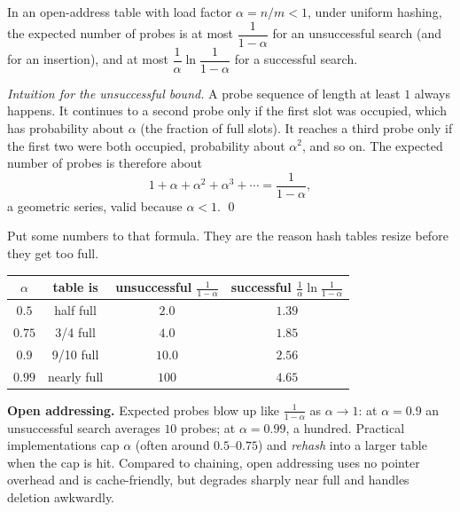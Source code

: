 \begin{theorem}
\label{ch11:open-addr-theorem}
In an open-address table with load factor $\alpha = n/m < 1$, under uniform hashing, the expected number of probes is at most $\dfrac{1}{1-\alpha}$ for an unsuccessful search (and for an insertion), and at most $\dfrac{1}{\alpha}\ln\dfrac{1}{1-\alpha}$ for a successful search.
\end{theorem}

\begin{proof}[Intuition for the unsuccessful bound]
A probe sequence of length at least $1$ always happens. It continues to a second probe only if the first slot was occupied, which has probability about $\alpha$ (the fraction of full slots). It reaches a third probe only if the first two were both occupied, probability about $\alpha^2$, and so on. The expected number of probes is therefore about
\[
  1 + \alpha + \alpha^2 + \alpha^3 + \cdots = \frac{1}{1-\alpha},
\]
a geometric series, valid because $\alpha < 1$. \qed
\end{proof}

Put some numbers to that formula. They are the reason hash tables resize before they get too full.

\begin{center}
\begin{tabular}{cccc}
\toprule
$\alpha$ & table is & unsuccessful $\frac{1}{1-\alpha}$ & successful $\frac{1}{\alpha}\ln\frac{1}{1-\alpha}$ \\
\midrule
$0.5$  & half full     & $2.0$  & $1.39$ \\
$0.75$ & 3/4 full      & $4.0$  & $1.85$ \\
$0.9$  & 9/10 full     & $10.0$ & $2.56$ \\
$0.99$ & nearly full   & $100$  & $4.65$ \\
\bottomrule
\end{tabular}
\end{center}

\begin{complexitybox}
\textbf{Open addressing.} Expected probes blow up like $\frac{1}{1-\alpha}$ as $\alpha \to 1$: at $\alpha = 0.9$ an unsuccessful search averages $10$ probes; at $\alpha = 0.99$, a hundred. Practical implementations cap $\alpha$ (often around $0.5$--$0.75$) and \emph{rehash} into a larger table when the cap is hit. Compared to chaining, open addressing uses no pointer overhead and is cache-friendly, but degrades sharply near full and handles deletion awkwardly.
\end{complexitybox}

